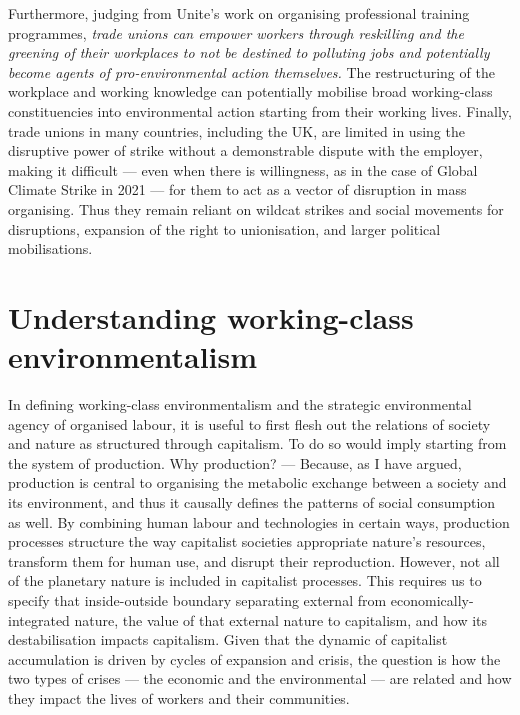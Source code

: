 \documentclass[a4paper, nobind]{templates/ociamthesis}
\begin{document}
Furthermore, judging from Unite's work on organising professional training programmes, \emph{trade unions can empower workers through reskilling and the greening of their workplaces to not be destined to polluting jobs and potentially become agents of pro-environmental action themselves.} The restructuring of the workplace and working knowledge can potentially mobilise broad working-class constituencies into environmental action starting from their working lives. Finally, trade unions in many countries, including the UK, are limited in using the disruptive power of strike without a demonstrable dispute with the employer, making it difficult --- even when there is willingness, as in the case of Global Climate Strike in 2021 --- for them to act as a vector of disruption in mass organising. Thus they remain reliant on wildcat strikes and social movements for disruptions, expansion of the right to unionisation, and larger political mobilisations.

\hypertarget{understanding-working-class-environmentalism}{%
\section{Understanding working-class environmentalism}\label{understanding-working-class-environmentalism}}

In defining working-class environmentalism and the strategic environmental agency of organised labour, it is useful to first flesh out the relations of society and nature as structured through capitalism. To do so would imply starting from the system of production. Why production? --- Because, as I have argued, production is central to organising the metabolic exchange between a society and its environment, and thus it causally defines the patterns of social consumption as well. By combining human labour and technologies in certain ways, production processes structure the way capitalist societies appropriate nature's resources, transform them for human use, and disrupt their reproduction. However, not all of the planetary nature is included in capitalist processes. This requires us to specify that inside-outside boundary separating external from economically-integrated nature, the value of that external nature to capitalism, and how its destabilisation impacts capitalism. Given that the dynamic of capitalist accumulation is driven by cycles of expansion and crisis, the question is how the two types of crises --- the economic and the environmental --- are related and how they impact the lives of workers and their communities.
\end{document}
